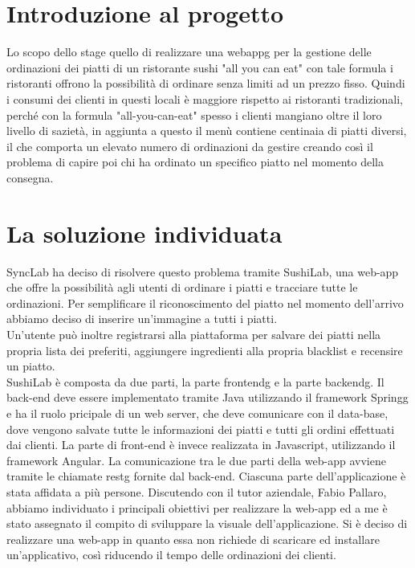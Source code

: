 \section{Introduzione al progetto}
Lo scopo dello stage quello di realizzare una \gls{webappg} per la gestione delle ordinazioni dei piatti di un ristorante sushi "all you can eat" con tale formula i ristoranti offrono la possibilità di ordinare senza limiti ad un prezzo fisso. Quindi i consumi dei clienti in questi locali è maggiore rispetto ai ristoranti tradizionali, perché con la formula "all-you-can-eat" spesso i clienti mangiano oltre il loro livello di sazietà, in aggiunta a questo il menù contiene centinaia di piatti diversi, il che comporta un elevato numero di ordinazioni da gestire creando così il problema di capire poi chi ha ordinato un specifico piatto nel momento della consegna.

\section{La soluzione individuata}
SyncLab ha deciso di risolvere questo problema tramite SushiLab, una web-app che offre la possibilità agli utenti di ordinare i piatti e tracciare tutte le ordinazioni. Per semplificare il riconoscimento del piatto nel momento dell'arrivo abbiamo deciso di inserire un'immagine a tutti i piatti.\\ 
Un'utente può inoltre registrarsi alla piattaforma per salvare dei piatti nella propria lista dei preferiti, aggiungere ingredienti alla propria blacklist e recensire un piatto.\\
SushiLab è composta da due parti, la parte \gls{frontendg} e la parte \gls{backendg}. Il back-end deve essere implementato tramite Java utilizzando il framework \gls{Springg} e ha il ruolo pricipale di un web server, che deve comunicare con il data-base, dove vengono salvate tutte le informazioni dei piatti e tutti gli ordini effettuati dai clienti.
La parte di front-end è invece realizzata in Javascript, utilizzando il framework Angular. La comunicazione tra le due parti della web-app avviene tramite le chiamate \gls{restg} fornite dal back-end.
Ciascuna parte dell'applicazione è stata affidata a più persone. Discutendo con il tutor aziendale, Fabio Pallaro, abbiamo individuato i principali obiettivi per realizzare la web-app ed a me è stato assegnato il compito di sviluppare la visuale dell'applicazione. 
Si è deciso di realizzare una web-app in quanto essa non richiede di scaricare ed installare un'applicativo, così riducendo il tempo delle ordinazioni dei clienti.

